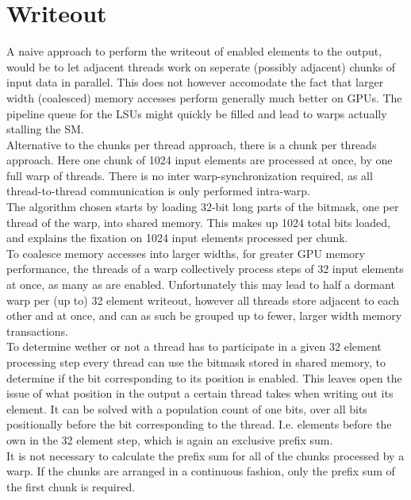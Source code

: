 \documentclass{tudscrreprt}
\begin{document}
		\section{Writeout}
			\label{sec:analysis_writeout}
			A naive approach to perform the writeout of enabled elements to the output, would be to let adjacent threads work on seperate (possibly adjacent) chunks of input data in parallel. This does not however accomodate the fact that larger width (coalesced) memory accesses perform generally much better on GPUs. The pipeline queue for the LSUs might quickly be filled and lead to warps actually stalling the SM. \\
			
			Alternative to the chunks per thread approach, there is a chunk per threads approach. Here one chunk of 1024 input elements are processed at once, by one full warp of threads. There is no inter warp-synchronization required, as all thread-to-thread communication is only performed intra-warp. \\
			The algorithm chosen starts by loading 32-bit long parts of the bitmask, one per thread of the warp, into shared memory. This makes up 1024 total bits loaded, and explains the fixation on 1024 input elements processed per chunk. \\
			To coalesce memory accesses into larger widths, for greater GPU memory performance, the threads of a warp collectively process steps of 32 input elements at once, as many as are enabled. Unfortunately this may lead to half a dormant warp per (up to) 32 element writeout, however all threads store adjacent to each other and at once, and can as such be grouped up to fewer, larger width memory transactions. \\
			To determine wether or not a thread has to participate in a given 32 element processing step every thread can use the bitmask stored in shared memory, to determine if the bit corresponding to its position is enabled. This leaves open the issue of what position in the output a certain thread takes when writing out its element. It can be solved with a population count of one bits, over all bits positionally before the bit corresponding to the thread. I.e. elements before the own in the 32 element step, which is again an exclusive prefix sum. \\
			It is not necessary to calculate the prefix sum for all of the chunks processed by a warp. If the chunks are arranged in a continuous fashion, only the prefix sum of the first chunk is required. \\
			
\end{document}
